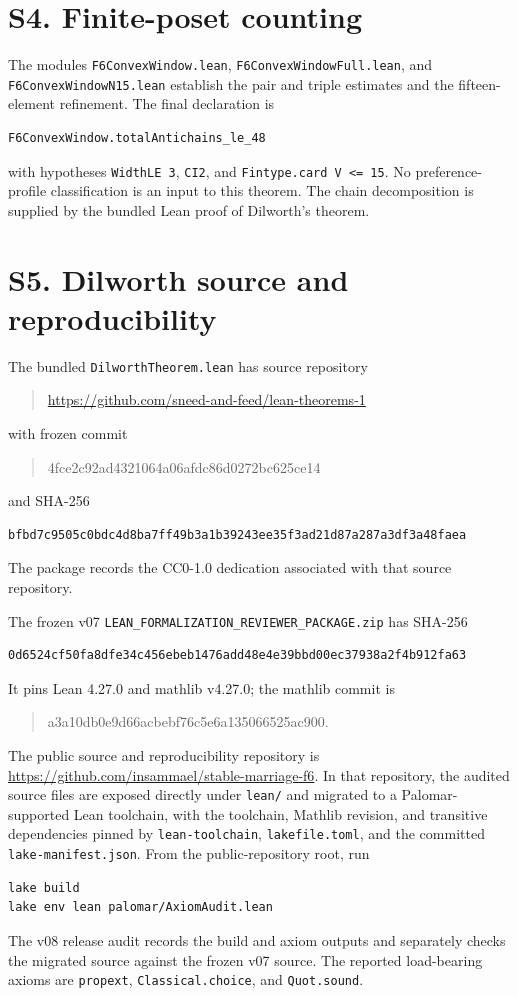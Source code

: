 \documentclass[11pt]{article}
\begin{document}
\section*{S4. Finite-poset counting}
The modules \texttt{F6ConvexWindow.lean},
\texttt{F6ConvexWindowFull.lean}, and
\texttt{F6ConvexWindowN15.lean} establish the pair and triple estimates and
the fifteen-element refinement.  The final declaration is
\begin{verbatim}
F6ConvexWindow.totalAntichains_le_48
\end{verbatim}
with hypotheses \texttt{WidthLE 3}, \texttt{CI2}, and
\texttt{Fintype.card V <= 15}.  No preference-profile classification is an
input to this theorem.  The chain decomposition is supplied by the bundled Lean proof of Dilworth's theorem.

\section*{S5. Dilworth source and reproducibility}
The bundled \texttt{DilworthTheorem.lean} has source repository
\begin{quote}\small
\url{https://github.com/sneed-and-feed/lean-theorems-1}
\end{quote}
with frozen commit
\begin{quote}\ttfamily\small
4fce2c92ad4321064a06afdc86d0272bc625ce14
\end{quote}
and SHA-256
{\footnotesize
\begin{verbatim}
bfbd7c9505c0bdc4d8ba7ff49b3a1b39243ee35f3ad21d87a287a3df3a48faea
\end{verbatim}
}
The package records the CC0-1.0 dedication associated with that source
repository.

The frozen v07 \texttt{LEAN\_FORMALIZATION\_REVIEWER\_PACKAGE.zip}
has SHA-256
{\footnotesize
\begin{verbatim}
0d6524cf50fa8dfe34c456ebeb1476add48e4e39bbd00ec37938a2f4b912fa63
\end{verbatim}
}
It pins Lean 4.27.0 and mathlib v4.27.0; the mathlib commit is
\begin{quote}\ttfamily\small
a3a10db0e9d66acbebf76c5e6a135066525ac900.
\end{quote}
The public source and reproducibility repository is
\url{https://github.com/insammael/stable-marriage-f6}.
In that repository, the audited source files are exposed
directly under \texttt{lean/} and migrated to a Palomar-supported Lean
toolchain, with the toolchain, Mathlib revision, and transitive dependencies
pinned by \texttt{lean-toolchain}, \texttt{lakefile.toml}, and the committed
\texttt{lake-manifest.json}.  From the public-repository root, run
\begin{verbatim}
lake build
lake env lean palomar/AxiomAudit.lean
\end{verbatim}
The v08 release audit records the build and axiom outputs and separately
checks the migrated source against the frozen v07 source.
The reported load-bearing axioms are \texttt{propext},
\texttt{Classical.choice}, and \texttt{Quot.sound}.
\end{document}
